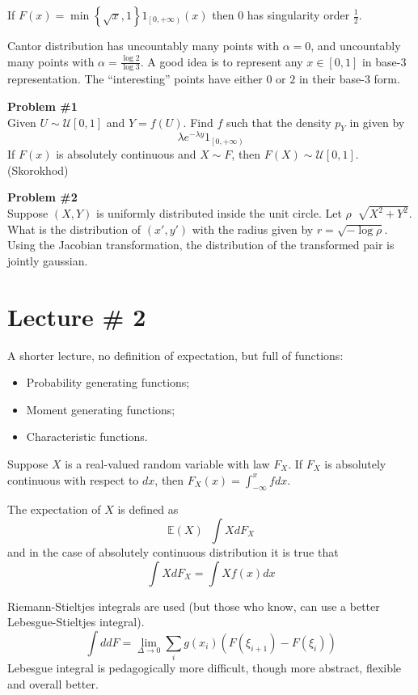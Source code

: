 \documentclass[a4paper]{article}
\newcommand{\obj}[1]{{\left\{ #1 \right \}}}
\newcommand{\clo}[1]{{\left [ #1 \right ]}}
\newcommand{\clop}[1]{{\left [ #1 \right )}}
\newcommand{\brac}[1]{{\left ( #1 \right )}}
\newcommand{\Ex}{\mathbb{E}}
\newcommand{\defn}{\mathop{\overset{\Delta}{=}}\nolimits}
\begin{document}
If $F(x)=\min\obj{\sqrt{x}, 1} 1_{\clop{0,+\infty}}(x)$ then $0$ has singularity order $\frac{1}{2}$.

Cantor distribution has uncountably many points with $\alpha = 0$, and uncountably many points with $\alpha = \frac{\log 2}{\log 3}$.
A good idea is to represent any $x\in \clo{0,1}$ in base-3 representation. The ``interesting'' points have either $0$ or $2$ in their base-3 form.

\noindent\textbf{Problem \#1}\hfill \\
	Given $U\sim \mathcal{U}\clo{0,1}$ and $Y=f(U)$. Find $f$ such that the density $p_Y$ in given by
	\[\lambda e^{-\lambda y} 1_{\clop{0,+\infty}}\]
	If $F(x)$ is absolutely continuous and $X\sim F$, then $F(X)\sim \mathcal{U}\clo{0,1}$. (Skorokhod)

\noindent\textbf{Problem \#2}\hfill \\
	Suppose $(X,Y)$ is uniformly distributed inside the unit circle. Let $\rho \defn \sqrt{X^2+Y^2}$. What is the distribution of $(x',y')$ with the radius given by $r = \sqrt{-\log \rho}$.
	Using the Jacobian transformation, the distribution of the transformed pair is jointly gaussian.


\section{Lecture \# 2} %
\label{sec:lecture_2}

A shorter lecture, no definition of expectation, but full of functions:
\begin{itemize}
	\item Probability generating functions;
	\item Moment generating functions;
	\item Characteristic functions.
\end{itemize}

Suppose $X$ is a real-valued random variable with law $F_X$. If $F_X$ is absolutely continuous with respect to $dx$, then $F_X(x) = \int_{-\infty}^x f dx$.

The expectation of $X$ is defined as \[\Ex(X) \defn \int X d{F_X}\] and in the case of absolutely continuous distribution it is true that \[\int X d{F_X} = \int X f(x) dx\]

Riemann-Stieltjes integrals are used (but those who know, can use a better Lebesgue-Stieltjes integral).
\[\int d dF = \lim_{\Delta\to 0} \sum_i g(x_i) \brac{F(\xi_{i+1}) - F(\xi_i)}\]
Lebesgue integral is pedagogically more difficult, though more abstract, flexible and overall better.
\end{document}
